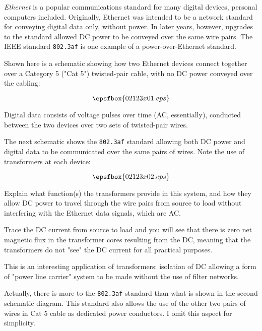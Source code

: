 

{\it Ethernet} is a popular communications standard for many digital devices, personal computers included.  Originally, Ethernet was intended to be a network standard for conveying digital data only, without power.  In later years, however, upgrades to the standard allowed DC power to be conveyed over the same wire pairs.  The IEEE standard {\tt 802.3af} is one example of a power-over-Ethernet standard.

Shown here is a schematic showing how two Ethernet devices connect together over a Category 5 ("Cat 5") twisted-pair cable, with no DC power conveyed over the cabling:

$$\epsfbox{02123x01.eps}$$

Digital data consists of voltage pulses over time (AC, essentially), conducted between the two devices over two sets of twisted-pair wires.

The next schematic shows the {\tt 802.3af} standard allowing both DC power and digital data to be communicated over the same pairs of wires.  Note the use of transformers at each device:

$$\epsfbox{02123x02.eps}$$

Explain what function(s) the transformers provide in this system, and how they allow DC power to travel through the wire pairs from source to load without interfering with the Ethernet data signals, which are AC.







Trace the DC current from source to load and you will see that there is zero net magnetic flux in the transformer cores resulting from the DC, meaning that the transformers do not "see" the DC current for all practical purposes.







This is an interesting application of transformers: isolation of DC allowing a form of "power line carrier" system to be made without the use of filter networks.

Actually, there is more to the {\tt 802.3af} standard than what is shown in the second schematic diagram.  This standard also allows the use of the other two pairs of wires in Cat 5 cable as dedicated power conductors.  I omit this aspect for simplicity.




